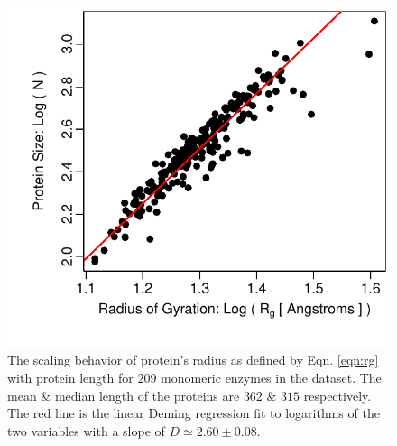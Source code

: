 \documentclass[11pt]{article}
\begin{document}
    \begin{figure}
        \begin{center}
        \includegraphics[width=5.5in]{fractal_dim_rad_gyration_nres.pdf}
        \end{center}
        \caption{The scaling behavior of protein's radius  as defined by Eqn. \ref{eqn:rg} with protein length for $209$ monomeric enzymes in the dataset. The mean \& median length of the proteins are $362$ \& $315$ respectively. The red line is the linear Deming regression fit to logarithms of the two variables with a slope of $D\simeq2.60\pm0.08$.}
        \label{fig:rg}
    \end{figure}
\end{document}
